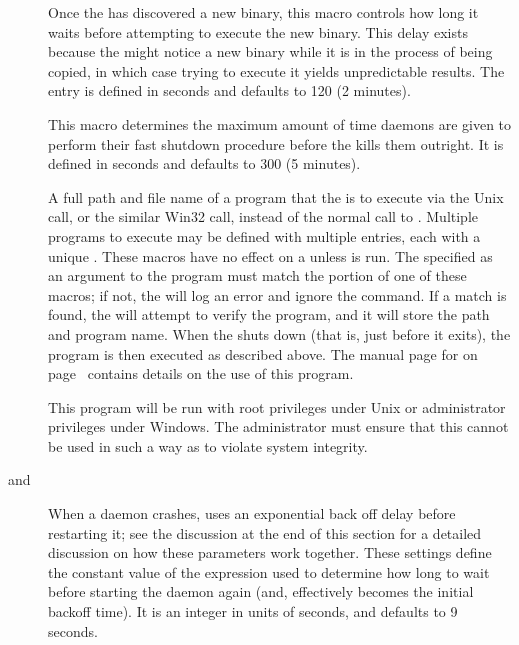 \begin{description}
\label{param:MasterNewBinaryDelay}
\item[\Macro{MASTER\_NEW\_BINARY\_DELAY}]
  Once the  has
  discovered a new binary, this macro controls how long it waits
  before attempting to execute the new binary.  This delay exists
  because the  might notice a new binary while it
  is in the process of being copied,
  in which case trying to execute it yields
  unpredictable results.  The entry is defined in seconds and
  defaults to 120 (2 minutes).

\label{param:ShutdownFastTimeout}
\item[\Macro{SHUTDOWN\_FAST\_TIMEOUT}]
  This macro determines the maximum
  amount of time daemons are given to perform their
  fast shutdown procedure before the  kills them
  outright.  It is defined in seconds and defaults to 300 (5 minutes).

\label{param:MasterShutdownProgram}
\item[\Macro{MASTER\_SHUTDOWN\_<Name>}]
  A full path and file name of
  a program that the  is to execute
  via the Unix  call, 
  or the similar Win32  call,
  instead of the normal call to .
  Multiple programs to execute may be defined with multiple entries,
  each with a unique .
  These macros have no effect on a
   unless  is run.  
  The  specified as an argument to the 
  program must match the  portion of one of these
   macros; if not, the
   will log an error and ignore the command.  If a
  match is found, the  will attempt to verify the
  program, and it will store the path and program name.  When the
   shuts down (that is, just before it exits),
  the program is then executed as described above.
  The manual page for  on
  page~\pageref{man-condor-set-shutdown} contains details on the use
  of this program.

  \Note This program will be run with root privileges under Unix 
  or administrator privileges under Windows.  
  The administrator must ensure that this cannot
  be used in such a way as to violate system integrity.

\label{param:MasterBackoffConstant}
\item[\Macro{MASTER\_BACKOFF\_CONSTANT} and
  \Macro{MASTER\_<name>\_BACKOFF\_CONSTANT}]
  When a daemon crashes,  uses an exponential back off
  delay before restarting it; see the discussion at the end of this
  section for a detailed discussion on how these parameters work together.
  These settings define the constant value of the expression used to
  determine how long to wait before starting the daemon again (and,
  effectively becomes the initial backoff time).  It is an integer in
  units of seconds, and defaults to 9 seconds.


\end{description}
